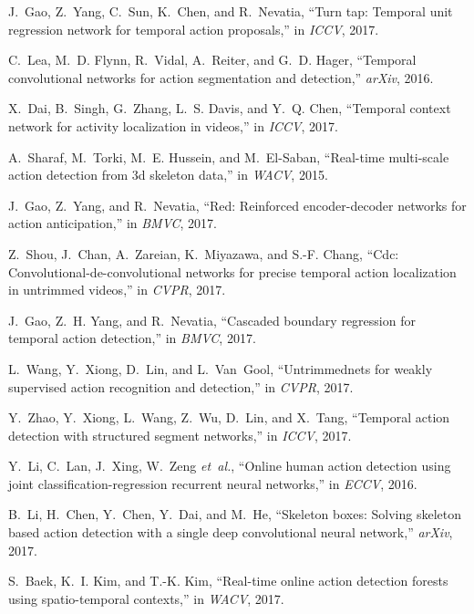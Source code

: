 \documentclass[10pt,twocolumn,letterpaper]{article}
\begin{document}
\begin{thebibliography}{10}
   J.~Gao, Z.~Yang, C.~Sun, K.~Chen, and R.~Nevatia, ``Turn tap: Temporal unit
     regression network for temporal action proposals,'' in \emph{ICCV}, 2017.
   
   C.~Lea, M.~D. Flynn, R.~Vidal, A.~Reiter, and G.~D. Hager, ``Temporal
     convolutional networks for action segmentation and detection,'' \emph{arXiv},
     2016.
   
   X.~Dai, B.~Singh, G.~Zhang, L.~S. Davis, and Y.~Q. Chen, ``Temporal context
     network for activity localization in videos,'' in \emph{ICCV}, 2017.
   
   A.~Sharaf, M.~Torki, M.~E. Hussein, and M.~El-Saban, ``Real-time multi-scale
     action detection from 3d skeleton data,'' in \emph{WACV}, 2015.
   
   J.~Gao, Z.~Yang, and R.~Nevatia, ``Red: Reinforced encoder-decoder networks for
     action anticipation,'' in \emph{BMVC}, 2017.
   
   Z.~Shou, J.~Chan, A.~Zareian, K.~Miyazawa, and S.-F. Chang, ``Cdc:
     Convolutional-de-convolutional networks for precise temporal action
     localization in untrimmed videos,'' in \emph{CVPR}, 2017.
   
   J.~Gao, Z.~H. Yang, and R.~Nevatia, ``Cascaded boundary regression for temporal
     action detection,'' in \emph{BMVC}, 2017.
   
   L.~Wang, Y.~Xiong, D.~Lin, and L.~Van~Gool, ``Untrimmednets for weakly
     supervised action recognition and detection,'' in \emph{CVPR}, 2017.
   
   Y.~Zhao, Y.~Xiong, L.~Wang, Z.~Wu, D.~Lin, and X.~Tang, ``Temporal action
     detection with structured segment networks,'' in \emph{ICCV}, 2017.
   
   Y.~Li, C.~Lan, J.~Xing, W.~Zeng \emph{et~al.}, ``Online human action detection
     using joint classification-regression recurrent neural networks,'' in
     \emph{ECCV}, 2016.
   
   B.~Li, H.~Chen, Y.~Chen, Y.~Dai, and M.~He, ``Skeleton boxes: Solving skeleton
     based action detection with a single deep convolutional neural network,''
     \emph{arXiv}, 2017.
   
   S.~Baek, K.~I. Kim, and T.-K. Kim, ``Real-time online action detection forests
     using spatio-temporal contexts,'' in \emph{WACV}, 2017.
   

\end{thebibliography}
\end{document}
